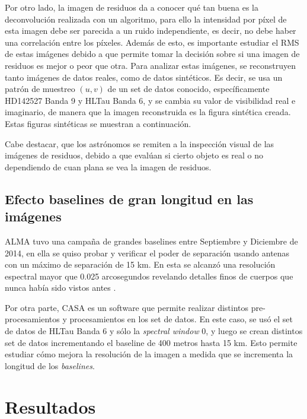 Por otro lado, la imagen de residuos da a conocer qué tan buena es la deconvolución realizada con un algoritmo, para ello la intensidad por píxel de esta imagen debe ser parecida a un ruido independiente, es decir, no debe haber una correlación entre los píxeles. Además de esto, es importante estudiar el RMS de estas imágenes debido a que permite tomar la decisión sobre si una imagen de residuos es mejor o peor que otra. Para analizar estas imágenes, se reconstruyen tanto imágenes de datos reales, como de datos sintéticos. Es decir, se usa un patrón de muestreo $(u,v)$ de un set de datos conocido, específicamente HD142527 Banda 9 y HLTau Banda 6, y se cambia su valor de visibilidad real e imaginario, de manera que la imagen reconstruida es la figura sintética creada. Estas figuras sintéticas se muestran a continuación.

Cabe destacar, que los astrónomos se remiten a la inspección visual de las imágenes de residuos, debido a que evalúan si cierto objeto es real o no dependiendo de cuan plana se vea la imagen de residuos.


\section{Efecto baselines de gran longitud en las imágenes}

ALMA tuvo una campaña de grandes baselines entre Septiembre y Diciembre de 2014, en ella se quiso probar y verificar el poder de separación usando antenas con un máximo de separación de 15 km. En esta se alcanzó una resolución espectral mayor que 0.025 arcosegundos revelando detalles finos de cuerpos que nunca había sido vistos antes \citep{longbaselines}.

Por otra parte, CASA \citep{casa} es un software que permite realizar distintos pre-procesamientos y procesamientos en los set de datos. En este caso, se usó el set de datos de HLTau Banda 6 y sólo la \textit{spectral window} 0, y luego se crean distintos set de datos incrementando el baseline de 400 metros hasta 15 km. Esto permite estudiar cómo mejora la resolución de la imagen a medida que se incrementa la longitud de los \textit{baselines}.


\chapter{Resultados}
\label{cap:resultados}
